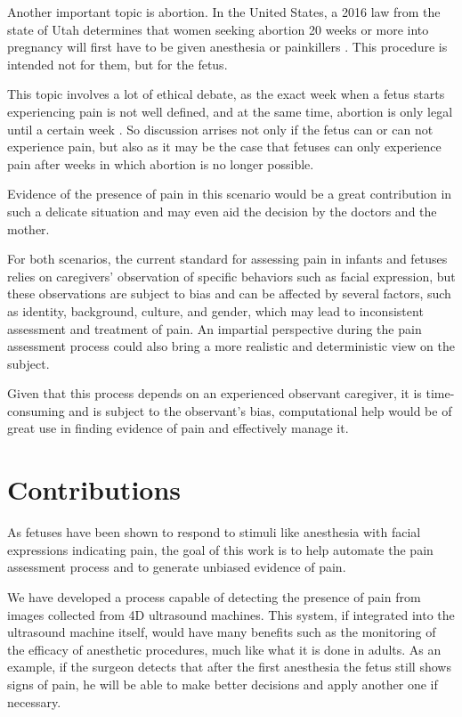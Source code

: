 Another important topic is abortion. In the United States, a 2016 law from the state of Utah determines that women seeking abortion 20 weeks or more into pregnancy will first have to be given anesthesia or painkillers \citep{healy2016nytimes}. This procedure is intended not for them, but for the fetus. 

This topic involves a lot of ethical debate, as the exact week when a fetus starts experiencing pain is not well defined, and at the same time, abortion is only legal until a certain week \citep{Derbyshire2006}. So discussion arrises not only if the fetus can or can not experience pain, but also as it may be the case that fetuses can only experience pain after weeks in which abortion is no longer possible.

Evidence of the presence of pain in this scenario would be a great contribution in such a delicate situation and may even aid the decision by the doctors and the mother.

For both scenarios, the current standard for assessing pain in infants and fetuses relies on caregivers’ observation of specific behaviors such as facial expression, but these observations are subject to bias and can be affected by several factors, such as identity, background, culture, and gender, which may lead to inconsistent assessment and treatment of pain. An impartial perspective during the pain assessment process could also bring a more realistic and deterministic view on the subject.

Given that this process depends on an experienced observant caregiver, it is time-consuming and is subject to the observant's bias, computational help would be of great use in finding evidence of pain and effectively manage it.

\section{Contributions}

As fetuses have been shown to respond to stimuli like anesthesia with facial expressions indicating pain, the goal of this work is to help automate the pain assessment process and to generate unbiased evidence of pain. 

We have developed a process capable of detecting the presence of pain from images collected from 4D ultrasound machines. This system, if integrated into the ultrasound machine itself, would  have many benefits such as the monitoring of the efficacy of anesthetic procedures, much like what it is done in adults. As an example, if the surgeon detects that after the first anesthesia the fetus still shows signs of pain, he will be able to make better decisions and apply another one if necessary.

